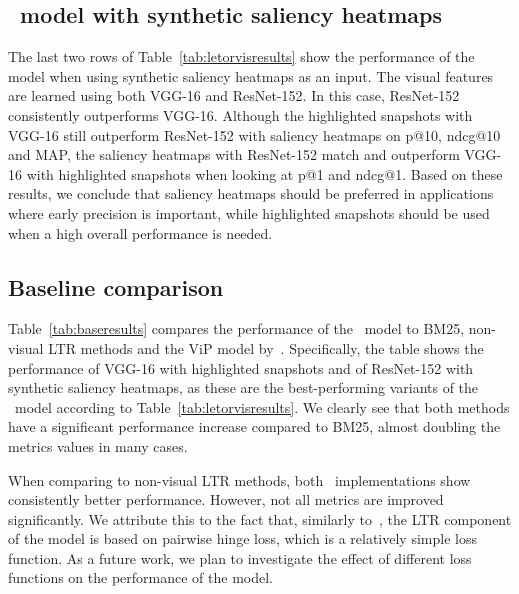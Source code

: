 \subsection{\modelname~model with synthetic saliency heatmaps}
The last two rows of Table~\ref{tab:letorvisresults} show the performance of the \modelname{} mo\-del when using synthetic saliency heatmaps as an input.
The visual features are learned using both VGG-16 and ResNet-152.
In this case, ResNet-152 consistently outperforms VGG-16.
Although the highlighted snapshots with VGG-16 still outperform ResNet-152 with saliency heatmaps on p@10, ndcg@10 and MAP, the saliency heatmaps with ResNet-152 match and outperform VGG-16 with highlighted snapshots when looking at p@1 and ndcg@1.
Based on these results, we conclude that saliency heatmaps should be preferred in applications where early precision is important,
while highlighted snapshots should be used when a high overall performance is needed.


\subsection{Baseline comparison}
Table~\ref{tab:baseresults} compares the performance of the \modelname~model to BM25, non-visual \ac{LTR} methods and the ViP model by~\citet{fan2017learning}. 
Specifically, the table shows the performance of VGG-16 with highlighted snapshots and of ResNet-152 with synthetic saliency heatmaps, as these are the best-performing variants of the \modelname~model according to Table~\ref{tab:letorvisresults}.
We clearly see that both methods have a significant performance increase compared to BM25, almost doubling the metrics values in many cases.

When comparing to non-visual \ac{LTR} methods, both \modelname~implementations show consistently better performance.
However, not all metrics are improved significantly.
We attribute this to the fact that, similarly to~\cite{fan2017learning}, the \ac{LTR} component of the \modelname{} model is based on pairwise hinge loss, which is a relatively simple loss function.
As a future work, we plan to investigate the effect of different loss functions on the performance of the \modelname{} model.

